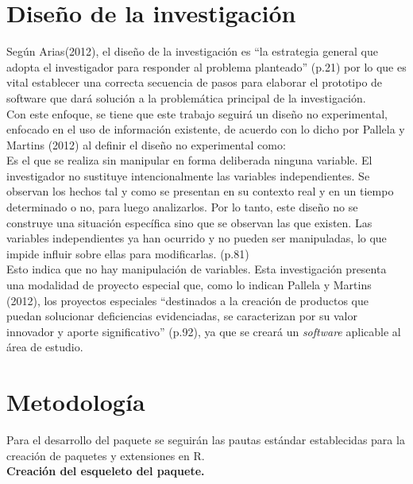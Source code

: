 	

\section{Dise\~no de la investigaci\'on}
	
Seg\'un Arias(2012), el dise\~no de la investigaci\'on es “la estrategia general que adopta el investigador para responder al problema planteado” (p.21) por lo que es vital establecer una correcta secuencia de pasos para elaborar el prototipo de software que dar\'a soluci\'on a la problem\'atica principal de la investigaci\'on.\\

Con este enfoque, se tiene que este trabajo seguir\'a un dise\~no no experimental, enfocado en el uso de informaci\'on existente, de acuerdo con lo dicho por Pallela y  Martins (2012) al definir el dise\~no no experimental como:\\

Es el que se realiza sin manipular en forma deliberada ninguna variable. El investigador no sustituye intencionalmente las variables independientes. Se observan los hechos tal y como se presentan en su contexto real y en un tiempo determinado o no, para luego analizarlos. Por lo tanto, este dise\~no no se construye una situaci\'on espec\'ifica sino que se observan las que existen. Las variables independientes ya han ocurrido y no pueden ser manipuladas, lo que impide influir sobre ellas para modificarlas. (p.81)\\

Esto indica que no hay manipulaci\'on de variables. Esta investigaci\'on presenta una modalidad de proyecto especial que, como lo indican Pallela y  Martins (2012), los proyectos especiales “destinados a la creaci\'on de productos que puedan solucionar deficiencias evidenciadas, se caracterizan por su valor innovador y aporte significativo” (p.92), ya que se crear\'a un \emph{software} aplicable al \'area de estudio.\\

\section{Metodolog\'ia}

Para el desarrollo del paquete  se seguir\'an las pautas est\'andar establecidas para la creación de paquetes y extensiones en R.\\

\noindent
\textbf{Creación del esqueleto del paquete.}\\


